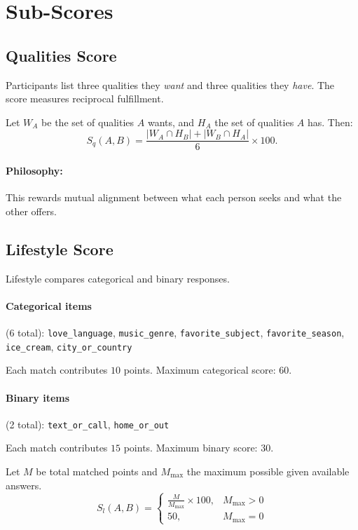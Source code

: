 \documentclass[11pt]{article}
\begin{document}
\section{Sub-Scores}
\subsection{Qualities Score}
Participants list three qualities they \emph{want} and three qualities they \emph{have}. The score measures reciprocal fulfillment.

Let $W_A$ be the set of qualities $A$ wants, and $H_A$ the set of qualities $A$ has. Then:
\[
S_q(A,B) = \frac{|W_A \cap H_B| + |W_B \cap H_A|}{6} \times 100.
\]

\paragraph{Philosophy:} This rewards mutual alignment between what each person seeks and what the other offers.

\subsection{Lifestyle Score}
Lifestyle compares categorical and binary responses.

\paragraph{Categorical items} (6 total):
\texttt{love\_language}, \texttt{music\_genre}, \texttt{favorite\_subject}, \texttt{favorite\_season}, \texttt{ice\_cream}, \texttt{city\_or\_country}

Each match contributes $10$ points. Maximum categorical score: $60$.

\paragraph{Binary items} (2 total):
\texttt{text\_or\_call}, \texttt{home\_or\_out}

Each match contributes $15$ points. Maximum binary score: $30$.

Let $M$ be total matched points and $M_{\max}$ the maximum possible given available answers.
\[
S_l(A,B) = \begin{cases}
\frac{M}{M_{\max}} \times 100, & M_{\max} > 0 \\
50, & M_{\max} = 0
\end{cases}
\]
\end{document}
